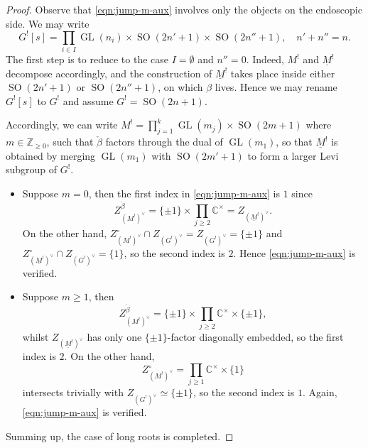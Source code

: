 \documentclass[11pt, a4paper, openany]{book}
\newenvironment{Proof of claim}
  {\renewcommand\qedsymbol{$\blacksquare$}\begin{proof}[Proof of claim]}
  {\end{proof}}
\newcommand{\Z}{\ensuremath{\mathbb{Z}}}
\newcommand{\CC}{\ensuremath{\mathbb{C}}}
\newcommand{\GL}{\operatorname{GL}}
\newcommand{\SO}{\operatorname{SO}}
\theoremstyle{remark}
\theoremstyle{remark}
\theoremstyle{remark}
\theoremstyle{remark}
\begin{document}
\begin{proof}
	Observe that \eqref{eqn:jump-m-aux} involves only the objects on the endoscopic side. We may write
	\[ G^![s] = \prod_{i \in I} \GL(n_i) \times \SO(2n'+1) \times \SO(2n''+1), \quad n' + n'' = n. \]
	The first step is to reduce to the case $I = \emptyset$ and $n'' = 0$. Indeed, $M^!$ and $\underline{M}^!$ decompose accordingly, and the construction of $\underline{M}^!$ takes place inside either $\SO(2n'+1)$ or $\SO(2n''+1)$, on which $\beta$ lives. Hence we may rename $G^![s]$ to $G^!$ and assume $G^! = \SO(2n+1)$.
	
	Accordingly, we can write $M^! = \prod_{j=1}^k \GL(m_j) \times \SO(2m+1)$ where $m \in \Z_{\geq 0}$, such that $\check{\beta}$ factors through the dual of $\GL(m_1)$, so that $\underline{M}^!$ is obtained by merging $\GL(m_1)$ with $\SO(2m'+1)$ to form a larger Levi subgroup of $G^!$.
	\begin{itemize}
		\item Suppose $m=0$, then the first index in \eqref{eqn:jump-m-aux} is $1$ since
		\[ Z_{(M^!)^\vee}^{\check{\beta}} = \{\pm 1\} \times \prod_{j \geq 2} \CC^\times = Z_{(\underline{M}^!)^\vee}. \]
		On the other hand, $Z_{(M^!)^\vee}^\circ \cap Z_{(G^!)^\vee} = Z_{(G^!)^\vee} = \{\pm 1\}$ and $Z_{(\underline{M}^!)^\vee}^\circ \cap Z_{(G^!)^\vee} = \{1\}$, so the second index is $2$. Hence \eqref{eqn:jump-m-aux} is verified.
		\item Suppose $m \geq 1$, then
		\[ Z_{(M^!)^\vee}^{\check{\beta}} = \{\pm 1\} \times \prod_{j \geq 2} \CC^\times \times \{\pm 1\} ,\]
		whilst $Z_{(\underline{M}^!)^\vee}$ has only one $\{\pm 1\}$-factor diagonally embedded, so the first index is $2$. On the other hand,
		\[ Z_{(M^!)^\vee}^\circ = \prod_{j \geq 1} \CC^\times \times \{1\} \]
		intersects trivially with $Z_{(G^!)^\vee} \simeq \{\pm 1\}$, so the second index is $1$. Again, \eqref{eqn:jump-m-aux} is verified.
	\end{itemize}

	Summing up, the case of long roots is completed.
\end{proof}
\end{document}
